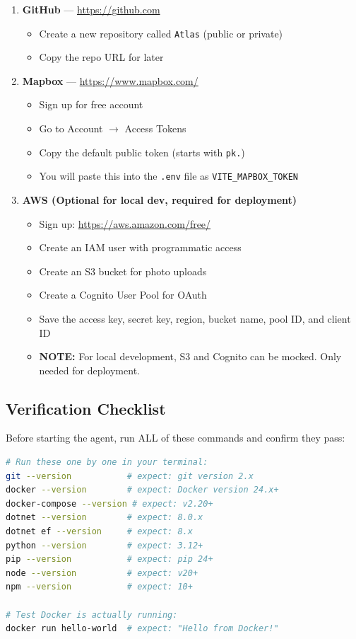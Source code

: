 \documentclass[12pt,letterpaper]{article}
\begin{document}
\begin{enumerate}

  \item \textbf{GitHub} --- \url{https://github.com}
  \begin{itemize}
    \item Create a new repository called \texttt{Atlas} (public or private)
    \item Copy the repo URL for later
  \end{itemize}

  \item \textbf{Mapbox} --- \url{https://www.mapbox.com/}
  \begin{itemize}
    \item Sign up for free account
    \item Go to Account $\rightarrow$ Access Tokens
    \item Copy the default public token (starts with \texttt{pk.})
    \item You will paste this into the \texttt{.env} file as \texttt{VITE\_MAPBOX\_TOKEN}
  \end{itemize}

  \item \textbf{AWS (Optional for local dev, required for deployment)}
  \begin{itemize}
    \item Sign up: \url{https://aws.amazon.com/free/}
    \item Create an IAM user with programmatic access
    \item Create an S3 bucket for photo uploads
    \item Create a Cognito User Pool for OAuth
    \item Save the access key, secret key, region, bucket name, pool ID, and client ID
    \item \textbf{NOTE:} For local development, S3 and Cognito can be mocked. Only needed for deployment.
  \end{itemize}

\end{enumerate}

\subsection{Verification Checklist}

Before starting the agent, run ALL of these commands and confirm they pass:

\begin{lstlisting}[style=code,language=bash]
# Run these one by one in your terminal:
git --version           # expect: git version 2.x
docker --version        # expect: Docker version 24.x+
docker-compose --version # expect: v2.20+
dotnet --version        # expect: 8.0.x
dotnet ef --version     # expect: 8.x
python --version        # expect: 3.12+
pip --version           # expect: pip 24+
node --version          # expect: v20+
npm --version           # expect: 10+

# Test Docker is actually running:
docker run hello-world  # expect: "Hello from Docker!"
\end{lstlisting}
\end{document}
